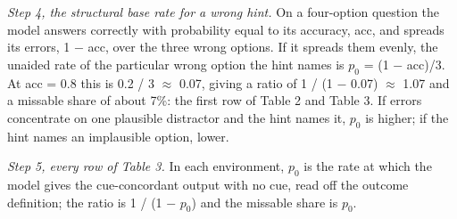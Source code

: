 \documentclass[11pt]{article}
\begin{document}
\emph{Step 4, the structural base rate for a wrong hint.} On a four-option question the model answers correctly with probability equal to its accuracy, acc, and spreads its errors, 1 $-$ acc, over the three wrong options. If it spreads them evenly, the unaided rate of the particular wrong option the hint names is $p_0$ = (1 $-$ acc)/3. At acc = 0.8 this is 0.2 / 3 $\approx$ 0.07, giving a ratio of 1 / (1 $-$ 0.07) $\approx$ 1.07 and a missable share of about 7\%: the first row of Table 2 and Table 3. If errors concentrate on one plausible distractor and the hint names it, $p_0$ is higher; if the hint names an implausible option, lower.

\emph{Step 5, every row of Table 3.} In each environment, $p_0$ is the rate at which the model gives the cue-concordant output with no cue, read off the outcome definition; the ratio is 1 / (1 $-$ $p_0$) and the missable share is $p_0$.
\end{document}
